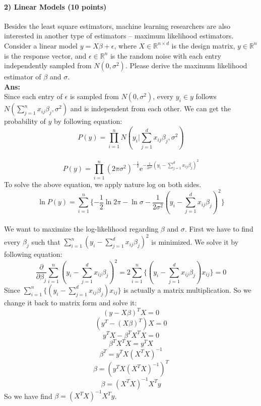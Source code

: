 \documentclass[11pt]{article}
\begin{document}
\paragraph{2) Linear Models (10 points)}
Besides the least square estimators, machine learning researchers are also interested in another type of estimators -- maximum likelihood estimators. Consider a linear model $y=X\beta+\epsilon$, where $X\in\mathbb{R}^{n \times d}$ is the design matrix, $y\in\mathbb{R}^{n}$ is the response vector, and $\epsilon\in\mathbb{R}^n$ is the random noise with each entry independently sampled from $N(0,\sigma^2)$. 
Please derive the maximum likelihood estimator of $\beta$ and $\sigma$.
\text{}\\
\textbf{Ans:}\\
Since each entry of $\epsilon$  is sampled from $N(0,\sigma^2)$, every $y_i \in y$ follows $N(\sum_{j=1}^{n} x_{ij}\beta_j,\sigma^2)$ and is independent from each other. We can get the probability of $y$ by following equation:\\
$$P(y) = \prod\limits_{i=1}^n N(y_i | \sum_{j=1}^{d} x_{ij}\beta_j,\sigma^2)$$\\
%
$$P(y) = \prod\limits_{i=1}^n (2 \pi\sigma^2)^{-\frac{1}{2}}\mathrm{e}^{-\frac{1}{2\sigma^2}(y_i-\sum_{j=1}^{d} x_{ij}\beta_j)^2}$$
%
To solve the above equation, we apply nature log on both sides.\\
$$\ln P(y) = \sum_{i=1}^{n} \{-\frac{1}{2}\ln 2\pi - \ln \sigma - \frac{1}{2\sigma^2}(y_i - \sum_{j=1}^{d} x_{ij}\beta_j)^2\}$$\\
We want to maximize the log-likelihood regarding $\beta$ and $\sigma$. First we have to find every $\beta_j$ such that $\sum_{i=1}^{n} (y_i - \sum_{j=1}^{d} x_{ij} \beta_j)^2$ is minimized. We solve it by following equation:\\
$$\frac{\partial}{\partial \beta_j} \sum_{i=1}^{n} (y_i - \sum_{j=1}^{d} x_{ij} \beta_j)^2 = 2\sum_{i=1}^{n} \{(y_i - \sum_{j=1}^{d} x_{ij}\beta_j)x_{ij}\}=0$$
%
Since $\sum_{i=1}^{n} \{(y_i - \sum_{j=1}^{d} x_{ij}\beta_j)x_{ij}\}$ is actually a matrix multiplication. So we change it back to matrix form and solve it:
$$(y-X\beta)^TX=0$$
$$(y^T - (X\beta)^T)X = 0$$
$$y^TX - \beta^TX^TX=0$$
$$\beta^TX^TX = y^TX$$
$$\beta^T = y^TX(X^TX)^{-1}$$
$$\beta = (y^TX(X^TX)^{-1})^T$$
$$\beta = (X^TX)^{-1}X^Ty$$
So we have find $\beta =(X^TX)^{-1}X^Ty$.\\
\end{document}
